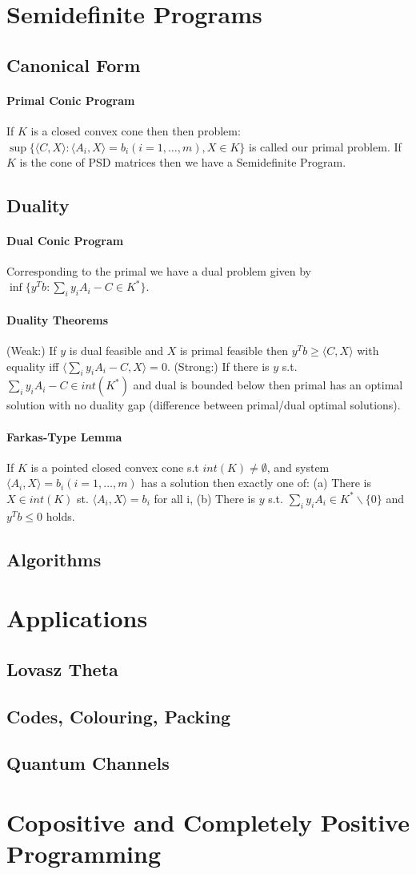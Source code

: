 \documentclass[letterpaper,11pt,oneside,onecolumn]{article}
\begin{document}
\section*{Semidefinite Programs}
\subsection*{Canonical Form}
\paragraph{Primal Conic Program} If $K$ is a closed convex cone then then problem:
$\sup \{\langle C, X \rangle : \langle A_i, X \rangle = b_i (i=1,\dots, m), X \in K \} $ is called our primal problem. If $K$ is the cone of PSD matrices then we have a Semidefinite Program.
\subsection*{Duality}
\paragraph{Dual Conic Program} Corresponding to the primal we have a dual problem given by $\inf \{ y^Tb : \sum_i y_iA_i - C \in K^*\}.$
\paragraph{Duality Theorems} (Weak:) If $y$ is dual feasible and $X$ is primal feasible then $y^Tb \geq \langle C, X\rangle$ with equality iff $\langle \sum_i y_i A_i - C, X\rangle = 0$. (Strong:) If there is $y$ s.t. $\sum_i y_i A_i - C \in int(K^*)$ and dual is bounded below then primal has an optimal solution with no duality gap (difference between primal/dual optimal solutions).
\paragraph{Farkas-Type Lemma} If $K$ is a pointed closed convex cone s.t $int(K) \neq \emptyset$, and system $\langle A_i, X \rangle = b_i (i=1,\dots,m)$ has a solution then exactly one of: (a) There is $X \in int (K)$ st. $\langle A_i, X\rangle = b_i$ for all i, (b) There is $y$ s.t. $\sum_i y_i A_i \in K^*\backslash \{0\}$ and $y^Tb \leq 0$ holds.
\subsection*{Algorithms}
\section*{Applications}
\subsection*{Lovasz Theta}
\subsection*{Codes, Colouring, Packing}
\subsection*{Quantum Channels}
\section*{Copositive and Completely Positive Programming}
\end{document}
